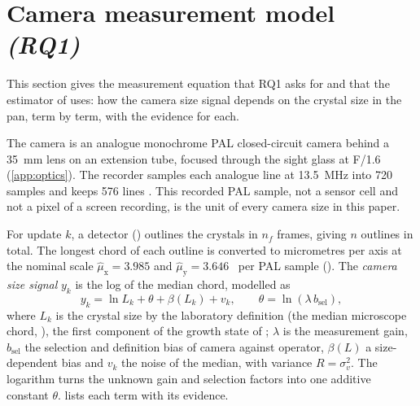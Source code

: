 \section{Camera measurement model \emph{(RQ1)}}\label{sec:measurement}

This section gives the measurement equation that RQ1 asks for and that the estimator of 
uses: how the camera size signal depends on the crystal size in the pan, term by term, with the evidence for each.

The camera is an analogue monochrome PAL closed-circuit camera behind a 35~mm lens on an extension tube, focused
through the sight glass at F/1.6 (\ref{app:optics}). The recorder samples each analogue line at 13.5~MHz into 720
samples and keeps 576 lines \citep{ITUBT601}. This recorded PAL sample, not a sensor cell and not a pixel of a screen
recording, is the unit of every camera size in this paper.

For update $k$, a detector () outlines the crystals in $n_f$ frames, giving $n$ outlines in total.
The longest chord of each outline is converted to micrometres per axis at the nominal scale
$\hat\mu_\mathrm{x} = 3.985$ and $\hat\mu_\mathrm{y} = 3.646$~\um{} per PAL sample (). The
\emph{camera size signal} $y_k$ is the log of the median chord, modelled as
\begin{equation}\label{eq:meas}
y_k = \ln L_k + \theta + \beta(L_k) + v_k, \qquad \theta = \ln(\lambda\, b_\mathrm{sel}),
\end{equation}
where $L_k$ is the crystal size by the laboratory definition (the median microscope chord, ),
the first component of the growth state of ; $\lambda$ is the measurement gain,
$b_\mathrm{sel}$ the selection and definition bias of camera against operator, $\beta(L)$ a size-dependent bias and
$v_k$ the noise of the median, with variance $R = \sigma_v^2$. The logarithm turns the unknown gain and selection
factors into one additive constant $\theta$.  lists each term with its evidence.

